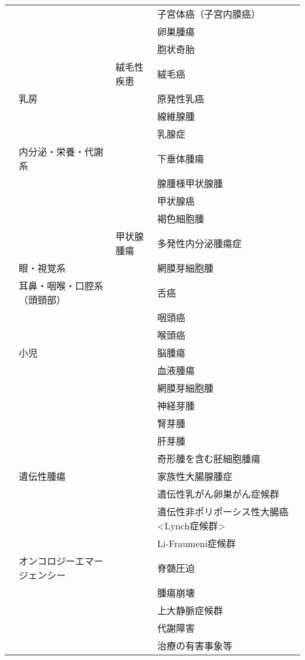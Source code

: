 \begin{xltabular}{\linewidth}{XXXX}
 &  &  & 子宮体癌（子宮内膜癌） \\
 &  &  & 卵巣腫瘍 \\
 &  &  & 胞状奇胎 \\
 &  & 絨毛性疾患 & 絨毛癌 \\
 & 乳房 &  & 原発性乳癌 \\
 &  &  & 線維腺腫 \\
 &  &  & 乳腺症 \\
 & 内分泌・栄養・代謝系 &  & 下垂体腫瘍 \\
 &  &  & 腺腫様甲状腺腫 \\
 &  &  & 甲状腺癌 \\
 &  &  & 褐色細胞腫 \\
 &  & 甲状腺腫瘍 & 多発性内分泌腫瘍症 \\
 & 眼・視覚系 &  & 網膜芽細胞腫 \\
 & 耳鼻・咽喉・口腔系（頭頸部） &  & 舌癌 \\
 &  &  & 咽頭癌 \\
 &  &  & 喉頭癌 \\
 & 小児 &  & 脳腫瘍 \\
 &  &  & 血液腫瘍 \\
 &  &  & 網膜芽細胞腫 \\
 &  &  & 神経芽腫 \\
 &  &  & 腎芽腫 \\
 &  &  & 肝芽腫 \\
 &  &  & 奇形腫を含む胚細胞腫瘍 \\
 & 遺伝性腫瘍 &  & 家族性大腸腺腫症 \\
 &  &  & 遺伝性乳がん卵巣がん症候群 \\
 &  &  & 遺伝性非ポリポーシス性大腸癌 <Lynch症候群> \\
 &  &  & Li-Fraumeni症候群 \\
 & オンコロジーエマージェンシー &  & 脊髄圧迫 \\
 &  &  & 腫瘍崩壊 \\
 &  &  & 上大静脈症候群 \\
 &  &  & 代謝障害 \\
 &  &  & 治療の有害事象等 \\
\bottomrule
\end{xltabular}



